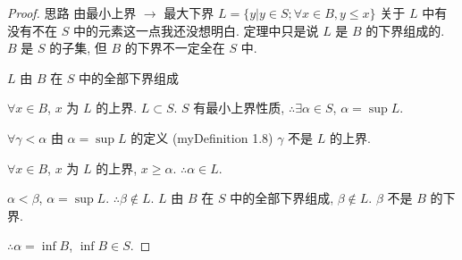     \begin{proof}
思路 由最小上界 $\rightarrow $ 最大下界
$L = \{y| y\in S; \forall x\in B, y\leq x\}$
    关于 $L$ 中有没有不在 $S$ 中的元素这一点我还没想明白. 定理中只是说 $L$ 是 $B$ 的下界组成的. $B$ 是 $S$ 的子集, 但 $B$ 的下界不一定全在 $S$ 中. 

$L$ 由 $B$ 在 $S$ 中的全部下界组成

$\forall x\in B$, $x$ 为 $L$ 的上界. $L\subset S$.
$S$ 有最小上界性质,
$\therefore \exists \alpha\in S$, $\alpha = \sup L$.

$\forall \gamma <\alpha$ 由 $\alpha = \sup L$ 的定义 (myDefinition 1.8)
$\gamma$ 不是 $L$ 的上界.

$\forall x \in B$, $x$ 为 $L$ 的上界, $x \geq \alpha$. $\therefore \alpha \in L$.

$\alpha < \beta$, $\alpha = \sup L$. $\therefore \beta \not\in L$.
$L$ 由 $B$ 在 $S$ 中的全部下界组成, $\beta \not\in L$.
$\beta$ 不是 $B$ 的下界.

$\therefore \alpha = \inf B$, $\inf B\in S$.
    \end{proof}


